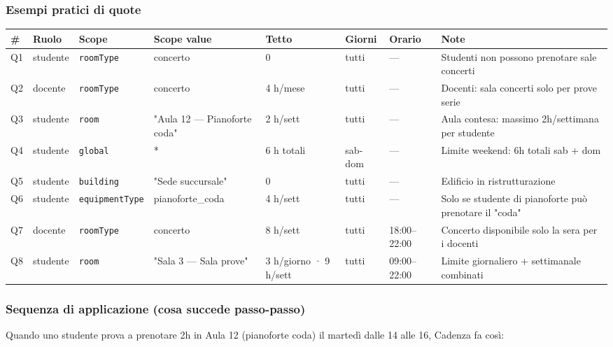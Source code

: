 \documentclass[11pt,a4paper]{article}
\begin{document}
\subsubsection{Esempi pratici di quote}


\begin{table}[H]
\centering
\small
\begin{tabularx}{\linewidth}{|X|X|X|X|X|X|X|X|}
\hline
\rowcolor{tableheader} \# & Ruolo & Scope & Scope value & Tetto & Giorni & Orario & Note \\
\hline
Q1 & studente & \texttt{roomType} & concerto & 0 & tutti & --- & Studenti non possono prenotare sale concerti \\
\hline
Q2 & docente & \texttt{roomType} & concerto & 4 h/mese & tutti & --- & Docenti: sala concerti solo per prove serie \\
\hline
Q3 & studente & \texttt{room} & "Aula 12 --- Pianoforte coda" & 2 h/sett & tutti & --- & Aula contesa: massimo 2h/settimana per studente \\
\hline
Q4 & studente & \texttt{global} & * & 6 h totali & sab-dom & --- & Limite weekend: 6h totali sab + dom \\
\hline
Q5 & studente & \texttt{building} & "Sede succursale" & 0 & tutti & --- & Edificio in ristrutturazione \\
\hline
Q6 & studente & \texttt{equipmentType} & pianoforte\_coda & 4 h/sett & tutti & --- & Solo se studente di pianoforte può prenotare il "coda" \\
\hline
Q7 & docente & \texttt{roomType} & concerto & 8 h/sett & tutti & 18:00--22:00 & Concerto disponibile solo la sera per i docenti \\
\hline
Q8 & studente & \texttt{room} & "Sala 3 --- Sala prove" & 3 h/giorno · 9 h/sett & tutti & 09:00--22:00 & Limite giornaliero + settimanale combinati \\
\hline
\end{tabularx}
\end{table}


\subsubsection{Sequenza di applicazione (cosa succede passo-passo)}


Quando uno studente prova a prenotare 2h in Aula 12 (pianoforte coda) il martedì dalle 14 alle 16, Cadenza fa così:
\end{document}
